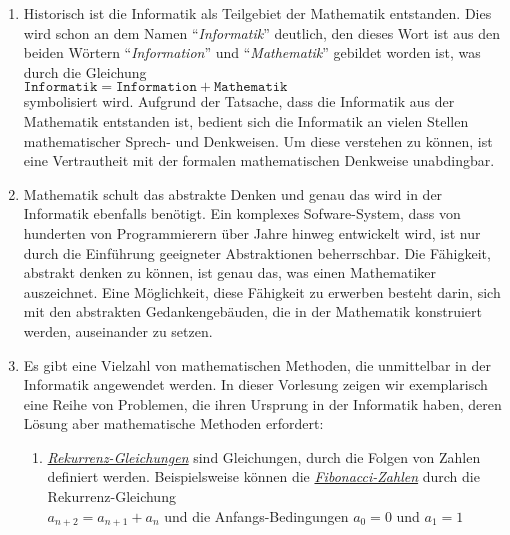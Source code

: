 \begin{enumerate}
\item Historisch ist die Informatik als Teilgebiet der Mathematik entstanden.  Dies wird schon an
      dem Namen  ``\emph{Informatik}''  deutlich, den dieses Wort ist aus den beiden Wörtern
      ``\emph{Information}'' und ``\emph{Mathematik}'' gebildet worden ist, was  
      durch die Gleichung 
      \\[0.2cm]
      \hspace*{1.3cm}
      $\texttt{Informatik} = \texttt{Information} + \texttt{Mathematik}$
      \\[0.2cm]
      symbolisiert wird.  Aufgrund der Tatsache, dass die Informatik aus der Mathematik entstanden
      ist, bedient sich die Informatik an vielen Stellen
      mathematischer Sprech- und Denkweisen.  Um diese verstehen zu können, ist eine 
      Vertrautheit mit der formalen mathematischen Denkweise unabdingbar.
\item Mathematik schult das abstrakte Denken und genau das wird in der Informatik ebenfalls
      benötigt.  Ein komplexes Sofware-System, dass von hunderten von Programmierern über Jahre
      hinweg entwickelt wird, ist nur durch die Einführung geeigneter Abstraktionen beherrschbar.
      Die Fähigkeit, abstrakt denken zu können, ist genau das, was einen Mathematiker auszeichnet.
      Eine Möglichkeit,  diese Fähigkeit zu erwerben besteht darin, sich mit den abstrakten
      Gedankengebäuden, die in der Mathematik konstruiert werden, auseinander zu setzen.
\item Es gibt eine Vielzahl von mathematischen Methoden, die unmittelbar in der Informatik
      angewendet werden.  In dieser Vorlesung zeigen wir exemplarisch eine Reihe von Problemen, die
      ihren Ursprung in der Informatik haben, deren Lösung aber mathematische Methoden erfordert:
      \begin{enumerate}
      \item \href{https://en.wikipedia.org/wiki/Recurrence_relation}{\emph{Rekurrenz-Gleichungen}}
            sind Gleichungen, durch die Folgen von Zahlen definiert werden.  Beispielsweise können die
            \href{https://de.wikipedia.org/wiki/Fibonacci-Folge}{\emph{Fibonacci-Zahlen}} durch die
            Rekurrenz-Gleichung 
            \\[0.2cm]
            \hspace*{1.3cm}
            $a_{n+2} = a_{n+1} + a_n$  \quad und die Anfangs-Bedingungen $a_0 = 0$ und $a_1 = 1$
            \\[0.2cm]

\end{enumerate}
\end{enumerate}
